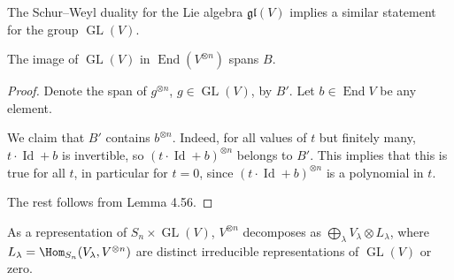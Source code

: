 The Schur--Weyl duality for the Lie algebra $\mathfrak{gl}(V)$ implies a similar statement for the group $\operatorname{GL}(V)$.
\begin{proposition}[4.58]
The image of $\operatorname{GL}(V)$ in $\operatorname{End}(V^{\otimes n})$ spans $B$.
\end{proposition}
\begin{proof}
Denote the span of $g^{\otimes n}$, $g\in\operatorname{GL}(V)$, by $B'$. Let $b\in\operatorname{End}V$ be any element.

We claim that $B'$ contains $b^{\otimes n}$. Indeed, for all values of $t$ but finitely many, $t\cdot\operatorname{Id}+b$ is invertible, so $(t\cdot\operatorname{Id}+b)^{\otimes n}$ belongs to $B'$. This implies that this is true for all $t$, in particular for $t=0$, since $(t\cdot\operatorname{Id}+b)^{\otimes n}$ is a polynomial in $t$.

The rest follows from Lemma 4.56.
\end{proof}
\begin{corollary}[4.59]
As a representation of $S_n\times\operatorname{GL}(V)$, $V^{\otimes n}$ decomposes as $\bigoplus_\lambda V_\lambda\otimes L_\lambda$, where $L_\lambda=\Hom_{S_n}(V_\lambda,V^{\otimes n})$ are distinct irreducible representations of $\operatorname{GL}(V)$ or zero.
\end{corollary}

